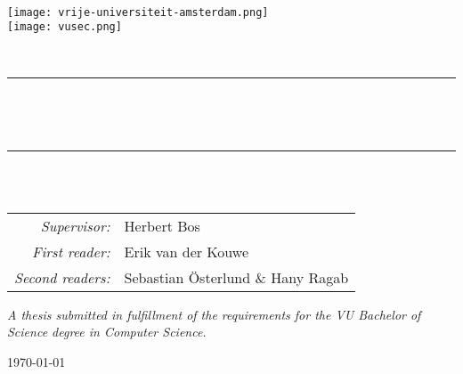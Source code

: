 \begin{titlepage}
    \newcommand{\HRule}{\rule{0.8\linewidth}{0.2mm}}

    \centering

    \vspace*{1em}
    \textsc{\large \theinstitution}\\[1em]

    \texttt{[image: vrije-universiteit-amsterdam.png]} \\[2em]
    \texttt{[image: vusec.png]}

    \vspace{4em}
    \textsc{\Large \thesubject}\\
    \vspace{4em}

    \HRule\\[0.7cm]

    \begin{minipage}{0.75\textwidth}
      \centering
      \setlength{\baselineskip}{2em}
      {\LARGE\bfseries \thetitle}\\[1em]
      \vspace{1em}
    \end{minipage}

    \HRule\\[1.5cm]

    {\Large \theauthor}\\
    \vspace{2em}
    \begin{minipage}{0.72\textwidth}
      \large
      \centering
      \begin{tabular}{ r l }
        \textit{Supervisor:}     & Herbert Bos        \\
        \textit{First reader:}   & Erik van der Kouwe \\
        \textit{Second readers:} & Sebastian \"{O}sterlund \& Hany Ragab
      \end{tabular}
    \end{minipage}

    \vfill
    \begin{minipage}{0.8\textwidth}
      \centering
      \textit{\large
        A thesis submitted in fulfillment of the requirements for the VU Bachelor of Science degree in Computer Science.
      }
    \end{minipage}

    \vspace{2em}
    {\large\today}

    \vspace{4em}
\end{titlepage}

